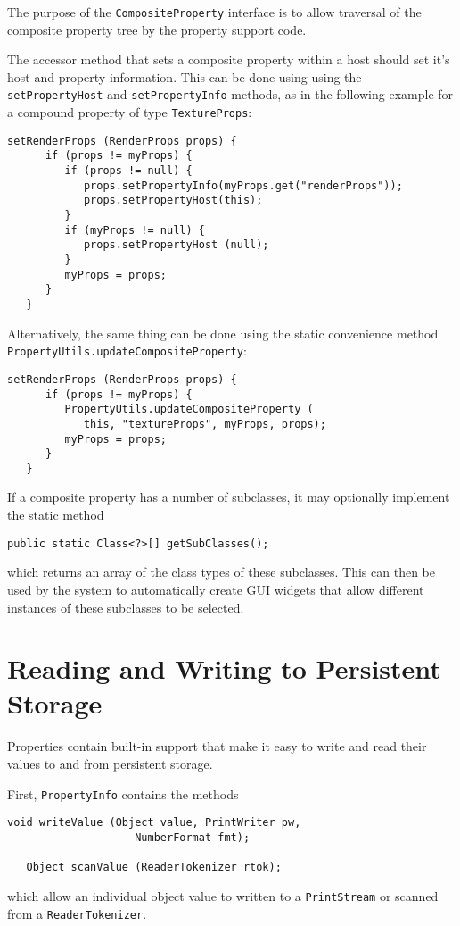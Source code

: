 The purpose of the {\tt CompositeProperty} interface is to allow
traversal of the composite property tree by the property support code.

The accessor method that sets a composite property within a host
should set it's host and property information. This can be done using
using the {\tt setPropertyHost} and {\tt setPropertyInfo} methods, as
in the following example for a compound property of type 
{\tt TextureProps}:
\begin{lstlisting}[]
   setRenderProps (RenderProps props) {
      if (props != myProps) {
         if (props != null) {
            props.setPropertyInfo(myProps.get("renderProps")); 
            props.setPropertyHost(this);
         }
         if (myProps != null) {
            props.setPropertyHost (null);
         }
         myProps = props;
      }
   }
\end{lstlisting}
Alternatively, the same thing can be done using the static convenience
method {\tt PropertyUtils.updateCompositeProperty}:
\begin{lstlisting}[]
   setRenderProps (RenderProps props) {
      if (props != myProps) {
         PropertyUtils.updateCompositeProperty (
            this, "textureProps", myProps, props);
         myProps = props;
      }
   }
\end{lstlisting}

If a composite property has a number of subclasses, it may optionally
implement the static method
\begin{lstlisting}[]
   public static Class<?>[] getSubClasses();
\end{lstlisting}
which returns an array of the class types of these subclasses. This
can then be used by the system to automatically create GUI widgets
that allow different instances of these subclasses to be selected.

\label{readWriteSec}
\section{Reading and Writing to Persistent Storage }

Properties contain built-in support that make it easy to write and
read their values to and from persistent storage. 

First, {\tt PropertyInfo} contains the methods
\begin{lstlisting}[]
   void writeValue (Object value, PrintWriter pw, 
                    NumberFormat fmt);

   Object scanValue (ReaderTokenizer rtok);
\end{lstlisting}
which allow an individual object value to written to
a {\tt PrintStream} or scanned from a {\tt ReaderTokenizer}.

